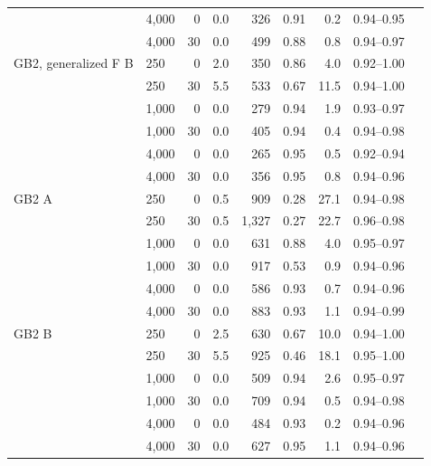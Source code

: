 {\begin{longtable}{llrrrrrrr}
 & 4,000 & 0 & 0.0 & 326 & 0.91 & 0.2 & 0.94--0.95 \\
 & 4,000 & 30 & 0.0 & 499 & 0.88 & 0.8 & 0.94--0.97 \\
GB2, generalized F B & 250 & 0 & 2.0 & 350 & 0.86 & 4.0 & 0.92--1.00 \\
 & 250 & 30 & 5.5 & 533 & 0.67 & 11.5 & 0.94--1.00 \\
 & 1,000 & 0 & 0.0 & 279 & 0.94 & 1.9 & 0.93--0.97 \\
 & 1,000 & 30 & 0.0 & 405 & 0.94 & 0.4 & 0.94--0.98 \\
 & 4,000 & 0 & 0.0 & 265 & 0.95 & 0.5 & 0.92--0.94 \\
 & 4,000 & 30 & 0.0 & 356 & 0.95 & 0.8 & 0.94--0.96 \\
GB2 A & 250 & 0 & 0.5 & 909 & 0.28 & 27.1 & 0.94--0.98 \\
 & 250 & 30 & 0.5 & 1,327 & 0.27 & 22.7 & 0.96--0.98 \\
 & 1,000 & 0 & 0.0 & 631 & 0.88 & 4.0 & 0.95--0.97 \\
 & 1,000 & 30 & 0.0 & 917 & 0.53 & 0.9 & 0.94--0.96 \\
 & 4,000 & 0 & 0.0 & 586 & 0.93 & 0.7 & 0.94--0.96 \\
 & 4,000 & 30 & 0.0 & 883 & 0.93 & 1.1 & 0.94--0.99 \\
GB2 B & 250 & 0 & 2.5 & 630 & 0.67 & 10.0 & 0.94--1.00 \\
 & 250 & 30 & 5.5 & 925 & 0.46 & 18.1 & 0.95--1.00 \\
 & 1,000 & 0 & 0.0 & 509 & 0.94 & 2.6 & 0.95--0.97 \\
 & 1,000 & 30 & 0.0 & 709 & 0.94 & 0.5 & 0.94--0.98 \\
 & 4,000 & 0 & 0.0 & 484 & 0.93 & 0.2 & 0.94--0.96 \\
 & 4,000 & 30 & 0.0 & 627 & 0.95 & 1.1 & 0.94--0.96 \\
\end{longtable}}
\vspace{-0.5em}
